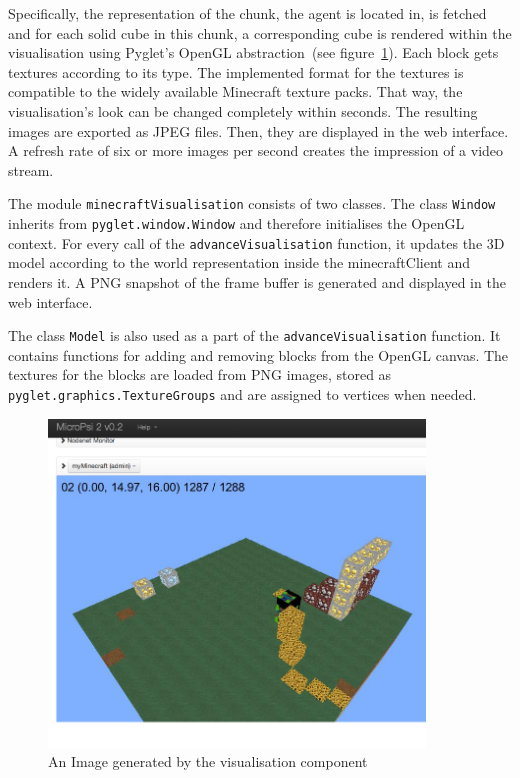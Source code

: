 Specifically, the representation of the chunk, the agent is located in, is fetched and for each solid cube in this chunk, a corresponding cube is rendered within the visualisation using Pyglet's OpenGL abstraction~(see figure~\ref{vis_screen}). Each block gets textures according to its type. The implemented format for the textures is compatible to the widely available Minecraft texture packs. That way, the visualisation's look can be changed completely within seconds. The resulting images are exported as JPEG files. Then, they are displayed in the web interface. A refresh rate of six or more images per second creates the impression of a video stream.

The module \texttt{minecraftVisualisation} consists of two classes. The class \texttt{Window} inherits from \texttt{pyglet.window.Window} and therefore initialises the OpenGL context. For every call of the \texttt{advanceVisualisation} function, it updates the 3D model according to the world representation inside the minecraftClient and renders it. A PNG snapshot of the frame buffer is generated and displayed in the web interface.

The class \texttt{Model} is also used as a part of the \texttt{advanceVisualisation} function. It contains functions for adding and removing blocks from the OpenGL canvas. The textures for the blocks are loaded from PNG images, stored as \texttt{pyglet.graphics.TextureGroups} and are assigned to vertices when needed.



\begin{figure}[h]
  \centering
    \includegraphics[width=10cm]{graphics/visualisation_screen}
  \caption{An Image generated by the visualisation component}
  \label{vis_screen}
\end{figure}



